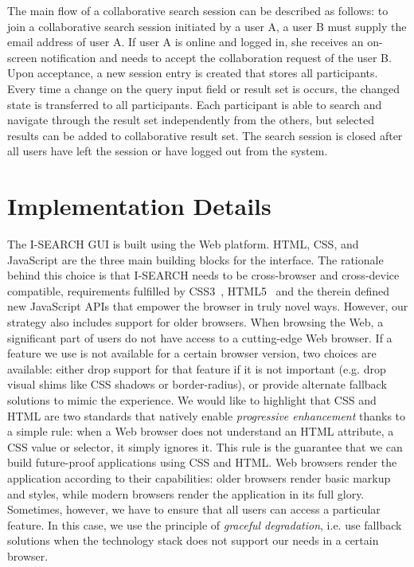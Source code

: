 \documentclass[runningheads,a4paper]{llncs} \usepackage[utf8]{inputenc}
\begin{document}
The main flow of a collaborative search session can be described as follows: to join a collaborative search session initiated by a user A, a user B must supply the email address of user A. If user A is online and logged in, she receives an on-screen notification and needs to accept the collaboration request of the user B. Upon acceptance, a new session entry is created that stores all participants. Every time a change on the query input field or result set is occurs, the changed state is transferred to all participants. Each participant is able to search and navigate through the result set independently from the others, but selected results can be added to collaborative result set. The search session is closed after all users have left the session or have logged out from the system.

\section{Implementation Details}
The \mbox{I-SEARCH} GUI is built using the Web platform. HTML, CSS, and JavaScript are the three main building blocks for the interface. The rationale behind this choice is that \mbox{I-SEARCH} needs to be cross-browser and cross-device compatible, requirements fulfilled by CSS3~\cite{css3}, HTML5~\cite{html5} and the therein defined new JavaScript APIs that empower the browser in truly novel ways. However, our strategy also includes support for older browsers. When browsing the Web, a significant part of users do not have access to a cutting-edge Web browser. If a feature we use is not available for a certain browser version, two choices are available: either drop support for that feature if it is not important (e.g. drop visual shims like CSS shadows or border-radius), or provide alternate fallback solutions to mimic the experience. We would like to highlight that CSS and HTML are two standards that natively enable \emph{progressive enhancement} thanks to a simple rule: when a Web browser does not understand an HTML attribute, a CSS value or selector, it simply ignores it. This rule is the guarantee that we can build future-proof applications using CSS and HTML. Web browsers render the application according to their capabilities: older browsers render basic markup and styles, while modern browsers render the application in its full glory. Sometimes, however, we have to ensure that all users can access a particular feature. In this case, we use the principle of \emph{graceful degradation}, i.e. use fallback solutions when the technology stack does not support our needs in a certain browser.
\end{document}
